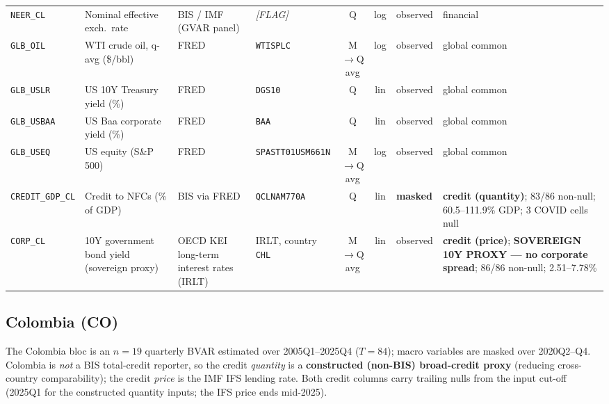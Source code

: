 {\begin{longtable}{@{}llp{2.5cm}p{2.4cm}cclp{2.6cm}@{}}
\texttt{NEER\_CL} & Nominal effective exch.\ rate & BIS / IMF (GVAR panel) & \textit{[FLAG]} & Q & log & observed & financial \\
\texttt{GLB\_OIL} & WTI crude oil, q-avg (\$/bbl) & FRED & \texttt{WTISPLC} & M$\to$Q avg & log & observed & global common \\
\texttt{GLB\_USLR} & US 10Y Treasury yield (\%) & FRED & \texttt{DGS10} & Q & lin & observed & global common \\
\texttt{GLB\_USBAA} & US Baa corporate yield (\%) & FRED & \texttt{BAA} & Q & lin & observed & global common \\
\texttt{GLB\_USEQ} & US equity (S\&P 500) & FRED & \texttt{SPASTT01USM661N} & M$\to$Q avg & log & observed & global common \\
\texttt{CREDIT\_GDP\_CL} & Credit to NFCs (\% of GDP) & BIS via FRED & \texttt{QCLNAM770A} & Q & lin & \textbf{masked} & \textbf{credit (quantity)}; 83/86 non-null; 60.5--111.9\% GDP; 3 COVID cells null \\
\texttt{CORP\_CL} & 10Y government bond yield (sovereign proxy) & OECD KEI long-term interest rates (IRLT) & IRLT, country \texttt{CHL} & M$\to$Q avg & lin & observed & \textbf{credit (price)}; \textbf{SOVEREIGN 10Y PROXY --- no corporate spread}; 86/86 non-null; 2.51--7.78\% \\
\end{longtable}}

\subsection{Colombia (CO)}\label{sec:data:CO}

The Colombia bloc is an $n=19$ quarterly BVAR estimated over 2005Q1--2025Q4
($T=84$); macro variables are masked over 2020Q2--Q4. Colombia is \emph{not} a
BIS total-credit reporter, so the credit \emph{quantity} is a
\textbf{constructed (non-BIS) broad-credit proxy} (reducing cross-country
comparability); the credit \emph{price} is the IMF IFS lending rate. Both
credit columns carry trailing nulls from the input cut-off (2025Q1 for the
constructed quantity inputs; the IFS price ends mid-2025).

